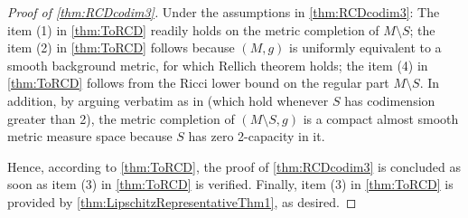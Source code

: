 \documentclass[12pt,a4paper,reqno]{amsart}
\begin{document}
\begin{proof}[Proof of \cref{thm:RCDcodim3}]
    Under the assumptions in \cref{thm:RCDcodim3}: The item (1) in \cref{thm:ToRCD} readily holds on the metric completion of $M\setminus S$; the item (2) in \cref{thm:ToRCD} follows because $(M,g)$ is uniformly equivalent to a smooth background metric, for which Rellich theorem holds; the item (4) in \cref{thm:ToRCD} follows from the Ricci lower bound on the regular part $M\setminus S$. In addition, by arguing verbatim as in \cite[Lemma 2.2]{DWWW} (which hold whenever $S$ has codimension greater than 2), the metric completion of $(M\setminus S,g)$ is a compact almost smooth metric measure space because $S$ has zero 2-capacity in it.
    
    Hence, according to \cref{thm:ToRCD}, the proof of \cref{thm:RCDcodim3} is concluded as soon as item (3) in \cref{thm:ToRCD} is verified. Finally, item (3) in \cref{thm:ToRCD} is provided by \cref{thm:LipschitzRepresentativeThm1}, as desired.
\end{proof}
\end{document}
